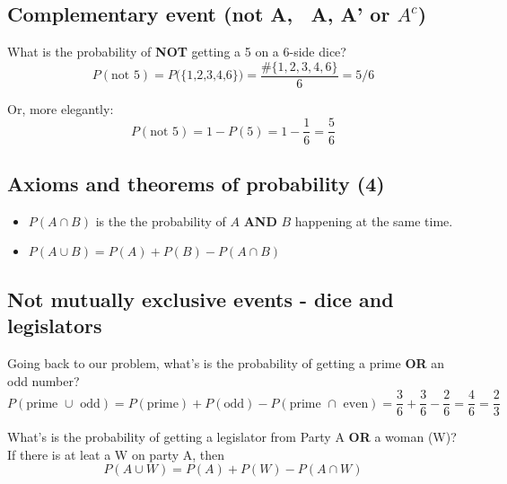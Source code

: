 \documentclass[11pt]{article}
\begin{document}
	\subsection*{Complementary event (not A, ~A, A' or $A^c$)}
	What is the probability of \textbf{NOT} getting a 5 on a 6-side dice?
	\[P(\text{not 5}) = P\text{(\{1,2,3,4,6\})} = \frac{\#\{1, 2, 3, 4, 6\}}{6} =  5/6	\]

	Or, more elegantly:
	\[P(\text{not 5}) = 1 - P(5) = 1 - \frac{1}{6} = \frac{5}{6}\]

	\subsection*{Axioms and theorems of probability (4)}
	\begin{itemize}
		\item $P(A \cap B)$ is the the probability of $A$ \textbf{AND} $B$ happening at the same time.																																																																																																																		
		\item  $P(A \cup B) = P(A) + P(B) - P(A \cap B)$ 
	\end{itemize}

	\subsection*{Not mutually exclusive events - dice and legislators}
	Going back to our problem, what's is the probability of getting a prime \textbf{OR} an odd number?
	\[P(\text{prime }\cup\text{ odd}) = P(\text{prime}) + P(\text{odd}) - P(\text{prime }\cap\text{ even}) 
	= \frac{3}{6} + \frac{3}{6} - \frac{2}{6} = \frac{4}{6} = \frac{2}{3}\]
	
	What's is the probability of getting a legislator from Party A \textbf{OR} a woman (W)?\\
	
	If there is at leat a W on party A, then
	\[P(A \cup W) = P(A) + P(W) - P(A \cap W)\]
\end{document}
